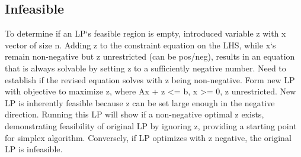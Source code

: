 \subsection*{Infeasible}
To determine if an LP`s feasible region is empty, introduced variable z with x vector of size n.
Adding z to the constraint equation on the LHS, while x`s remain non-negative but z unrestricted (can be pos/neg), results in an equation that is always solvable by setting z to a sufficiently negative number.
Need to establish if the revised equation solves with z being non-negative.
Form new LP with objective to maximize z, where Ax + z \textless{}= b, x \textgreater{}= 0, z unrestricted.
New LP is inherently feasible because z can be set large enough in the negative direction.
Running this LP will show if a non-negative optimal z exists, demonstrating feasibility of original LP by ignoring z, providing a starting point for simplex algorithm.
Conversely, if LP optimizes with z negative, the original LP is infeasible.


